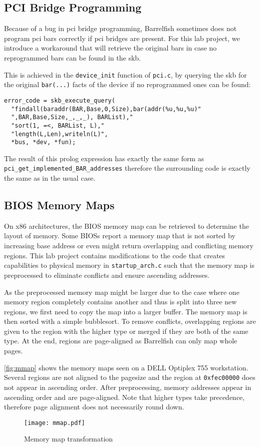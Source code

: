 \subsection{PCI Bridge Programming}

Because of a bug in \acs{pci} bridge programming, Barrelfish sometimes does not
program \acs{pci} \acp{bar} correctly if \acs{pci} bridges are present. For
this lab project, we introduce a workaround that will retrieve the original
\acp{bar} in case no reprogrammed \acp{bar} can be found in the \acs{skb}.

This is achieved in the \lstinline+device_init+ function of \lstinline+pci.c+,
by querying the \acs{skb} for the original \lstinline+bar(...)+ facts of the
device if no reprogrammed ones can be found:

\begin{lstlisting}
error_code = skb_execute_query(
  "findall(baraddr(BAR,Base,0,Size),bar(addr(%u,%u,%u)"
  ",BAR,Base,Size,_,_,_), BARList),"
  "sort(1, =<, BARList, L),"
  "length(L,Len),writeln(L)",
  *bus, *dev, *fun);
\end{lstlisting}

The result of this prolog expression has exactly the same form as
\lstinline+pci_get_+\linebreak \lstinline+implemented_BAR_addresses+ therefore
the surrounding code is exactly the same as in the usual case.

\subsection{BIOS Memory Maps}

On x86 architectures, the BIOS memory map can be retrieved to determine the
layout of memory. Some BIOSs report a memory map that is not sorted by
increasing base address or even might return overlapping and conflicting memory
regions.  This lab project contains modifications to the code that creates
capabilities to physical memory in \verb+startup_arch.c+ such that the memory
map is preprocessed to eliminate conflicts and ensure ascending addresses.

As the preprocessed memory map might be larger due to the case where one memory
region completely contains another and thus is split into three new regions, we
first need to copy the map into a larger buffer. The memory map is then sorted
with a simple bubblesort.  To remove conflicts, overlapping regions are given
to the region with the higher type or merged if they are both of the same type.
At the end, regions are page-aligned as Barrelfish can only map whole pages.

\autoref{fig:mmap} shows the memory maps seen on a DELL Optiplex 755
workstation. Several regions are not aligned to the pagesize and the region at
\lstinline+0xfec00000+ does not appear in ascending order. After preprocessing,
memory addresses appear in ascending order and are page-aligned. Note that
higher types take precedence, therefore page alignment does not necessarily
round down.

\begin{figure}[ht]
\centering
\texttt{[image: mmap.pdf]}
\caption{Memory map transformation}
\label{fig:mmap}
\end{figure}
